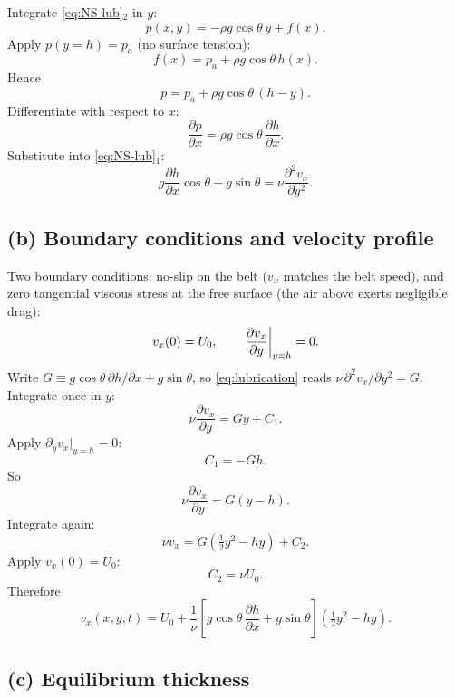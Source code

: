 \documentclass[11pt]{article}
\newcommand{\pd}[2]{\frac{\partial #1}{\partial #2}}
\newcommand{\pdd}[2]{\frac{\partial^{2} #1}{\partial #2^{2}}}
\begin{document}
Integrate \eqref{eq:NS-lub}$_2$ in $y$:
\[ p(x,y) = -\rho g\cos\theta\,y + f(x). \]
Apply $p(y=h)=p_a$ (no surface tension):
\[ f(x) = p_a + \rho g\cos\theta\,h(x). \]
Hence
\[ p = p_a + \rho g\cos\theta\,(h-y). \]
Differentiate with respect to $x$:
\[ \pd{p}{x} = \rho g\cos\theta\,\pd{h}{x}. \]
Substitute into \eqref{eq:NS-lub}$_1$:
\begin{equation}
\boxed{\;g\pd{h}{x}\cos\theta + g\sin\theta = \nu\pdd{v_x}{y}.\;}
\label{eq:lubrication}
\end{equation}

\subsection*{(b) Boundary conditions and velocity profile}

Two boundary conditions: no-slip on the belt ($v_x$ matches the belt speed), and zero tangential viscous stress at the free surface (the air above exerts negligible drag):
\[ v_x(0) = U_0,\qquad \eval{\pd{v_x}{y}}_{y=h} = 0. \]
Write $G \equiv g\cos\theta\,\partial h/\partial x + g\sin\theta$, so \eqref{eq:lubrication} reads $\nu\,\partial^2 v_x/\partial y^2 = G$. Integrate once in $y$:
\[ \nu\pd{v_x}{y} = Gy + C_1. \]
Apply $\partial_y v_x|_{y=h}=0$:
\[ C_1 = -Gh. \]
So
\[ \nu\pd{v_x}{y} = G(y-h). \]
Integrate again:
\[ \nu v_x = G\!\left(\tfrac12 y^2 - hy\right) + C_2. \]
Apply $v_x(0)=U_0$:
\[ C_2 = \nu U_0. \]
Therefore
\begin{equation}
\boxed{\;v_x(x,y,t) = U_0 + \frac{1}{\nu}\!\left[g\cos\theta\,\pd{h}{x} + g\sin\theta\right]\!\left(\tfrac12 y^2 - hy\right).\;}
\label{eq:vx-profile}
\end{equation}

\subsection*{(c) Equilibrium thickness}
\end{document}
